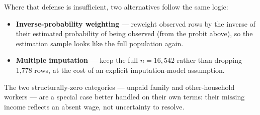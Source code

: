 \documentclass[11pt]{article}
\begin{document}
Where that defense is insufficient, two alternatives follow the same logic:

\begin{itemize}
  \item \textbf{Inverse-probability weighting} --- reweight observed rows by the inverse
  of their estimated probability of being observed (from the probit above), so the
  estimation sample looks like the full population again.
  \item \textbf{Multiple imputation} --- keep the full $n = 16{,}542$ rather than
  dropping 1{,}778 rows, at the cost of an explicit imputation-model assumption.
\end{itemize}

The two structurally-zero categories --- unpaid family and other-household workers --- are
a special case better handled on their own terms: their missing income reflects an
absent wage, not uncertainty to resolve.
\end{document}
